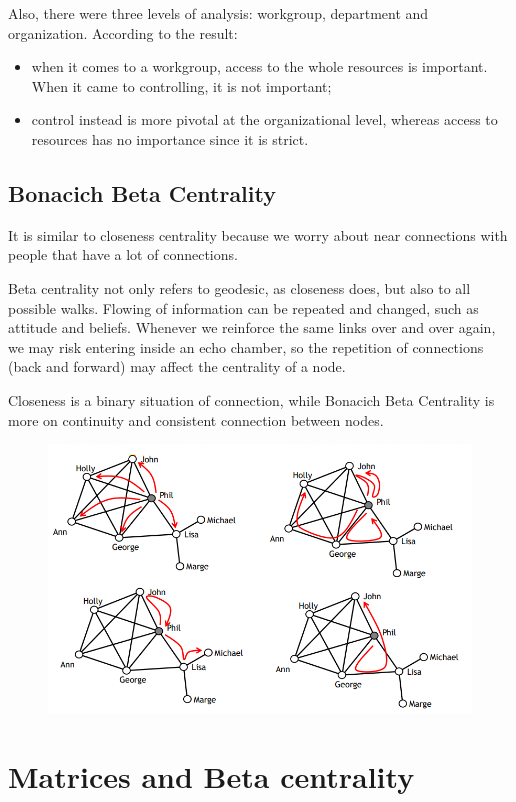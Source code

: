 \documentclass[
  notitlepage,
  onecolumn,
  openany]{book}
\providecommand{\tightlist}{%
  \setlength{\itemsep}{0pt}\setlength{\parskip}{0pt}}
\begin{document}
Also, there were three levels of analysis: workgroup, department and organization. According to the result:

\begin{itemize}
\tightlist
\item
  when it comes to a workgroup, access to the whole resources is important. When it came to controlling, it is not important;
\item
  control instead is more pivotal at the organizational level, whereas access to resources has no importance since it is strict.
\end{itemize}

\hypertarget{bonacich-beta-centrality}{%
\section{Bonacich Beta Centrality}\label{bonacich-beta-centrality}}

It is similar to closeness centrality because we worry about near connections with people that have a lot of connections.

Beta centrality not only refers to geodesic, as closeness does, but also to all possible walks. Flowing of information can be repeated and changed, such as attitude and beliefs. Whenever we reinforce the same links over and over again, we may risk entering inside an echo chamber, so the repetition of connections (back and forward) may affect the centrality of a node.

Closeness is a binary situation of connection, while Bonacich Beta Centrality is more on continuity and consistent connection between nodes.

\begin{figure}[h!]

{\centering \includegraphics[width=0.6\linewidth]{images/04-Centrality/Untitled 7} 

}

\end{figure}

\hypertarget{matrices-and-beta-centrality}{%
\chapter{Matrices and Beta centrality}\label{matrices-and-beta-centrality}}
\end{document}
